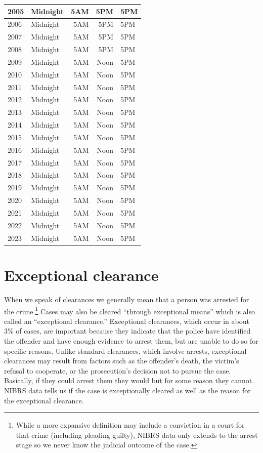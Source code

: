 \documentclass[
]{krantz}
\begin{document}
\begin{longtable}[t]{l|l|r|r|l}
\hline
2005 & Midnight & 5AM & 5PM & 5PM\\
\hline
2006 & Midnight & 5AM & 5PM & 5PM\\
\hline
2007 & Midnight & 5AM & 5PM & 5PM\\
\hline
2008 & Midnight & 5AM & 5PM & 5PM\\
\hline
2009 & Midnight & 5AM & Noon & 5PM\\
\hline
2010 & Midnight & 5AM & Noon & 5PM\\
\hline
2011 & Midnight & 5AM & Noon & 5PM\\
\hline
2012 & Midnight & 5AM & Noon & 5PM\\
\hline
2013 & Midnight & 5AM & Noon & 5PM\\
\hline
2014 & Midnight & 5AM & Noon & 5PM\\
\hline
2015 & Midnight & 5AM & Noon & 5PM\\
\hline
2016 & Midnight & 5AM & Noon & 5PM\\
\hline
2017 & Midnight & 5AM & Noon & 5PM\\
\hline
2018 & Midnight & 5AM & Noon & 5PM\\
\hline
2019 & Midnight & 5AM & Noon & 5PM\\
\hline
2020 & Midnight & 5AM & Noon & 5PM\\
\hline
2021 & Midnight & 5AM & Noon & 5PM\\
\hline
2022 & Midnight & 5AM & Noon & 5PM\\
\hline
2023 & Midnight & 5AM & Noon & 5PM\\
\hline
\end{longtable}

\section{Exceptional clearance}\label{exceptional-clearance}

When we speak of clearances we generally mean that a person
was arrested for the crime.\footnote{While a more expansive
  definition may include a conviction in a court for that
  crime (including pleading guilty), NIBRS data only extends
  to the arrest stage so we never know the judicial outcome
  of the case.} Cases may also be cleared ``through
exceptional means'' which is also called an ``exceptional
clearance.'' Exceptional clearances, which occur in about
3\% of cases, are important because they indicate that the
police have identified the offender and have enough evidence
to arrest them, but are unable to do so for specific
reasons. Unlike standard clearances, which involve arrests,
exceptional clearances may result from factors such as the
offender's death, the victim's refusal to cooperate, or the
prosecution's decision not to pursue the case. Basically, if
they could arrest them they would but for some reason they
cannot. NIBRS data tells us if the case is exceptionally
cleared as well as the reason for the exceptional clearance.
\end{document}

